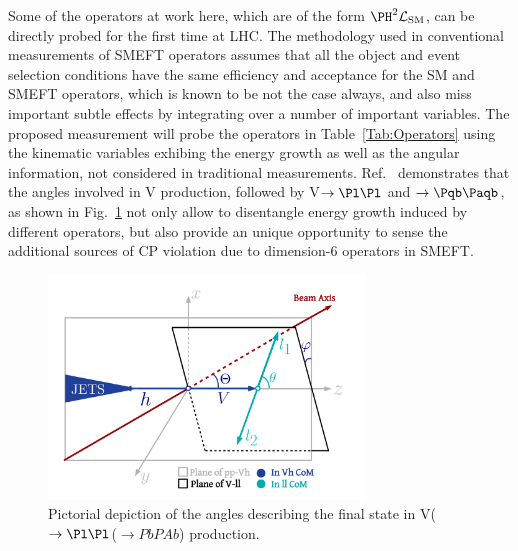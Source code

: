 \documentclass[a4paper,11pt]{article}
\newcommand{\Pb}{{{\Pqb}}\xspace}
\newcommand{\PAb}{{{{\Paqb}}}\xspace}
\renewcommand{\PV}{{{{V}}}\xspace}
\newcommand{\VH}{{{\PV}{\PH}}\xspace}
\begin{document}
Some of the operators at work here, which are of the form ${\PH}^2\mathcal{L}_{\text{SM}}$, can be directly probed for the first time at LHC.
The methodology used in conventional measurements of SMEFT operators assumes that all the object and event selection conditions have the same efficiency and acceptance for the SM and SMEFT operators, 
which is known to be not the case always, and also miss important subtle effects by integrating over a number of important variables.%
The proposed measurement will probe the operators in Table~\ref{Tab:Operators} 
using the kinematic variables exhibing the energy growth as well as the angular information, not considered in traditional measurements. 
Ref.~\cite{Banerjee:2019twi} demonstrates that the angles involved in \VH production, followed by \PV$\to \Pl \Pl $ and \PH$\to \Pb \PAb$, as  shown in Fig.~\ref{fig:HelicityFrame} 
not only allow to disentangle energy growth induced by different operators, 
but also provide an unique opportunity to sense the additional sources of CP violation due to dimension-6 operators in SMEFT.
\begin{figure}[hbtp]
\begin{center}
\includegraphics[width=0.75\textwidth]{Figures/LHE/TheThreeAnglesVh.pdf}
\end{center}
\caption{
Pictorial depiction of the angles describing the final state in \PV($\to \Pl \Pl$\PH($\to Pb PAb$) production.
}
\label{fig:HelicityFrame}
\end{figure}

\end{document}
